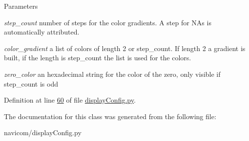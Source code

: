 \begin{DoxyParams}{Parameters}
\item[{\em step\_\-count}]number of steps for the color gradients. A step for NAs is automatically attributed. \item[{\em color\_\-gradient}]a list of colors of length 2 or step\_\-count. If length 2 a gradient is built, if the length is step\_\-count the list is used for the colors. \item[{\em zero\_\-color}]an hexadecimal string for the color of the zero, only visible if step\_\-count is odd \end{DoxyParams}


Definition at line \hyperlink{displayConfig_8py_source_l00060}{60} of file \hyperlink{displayConfig_8py_source}{displayConfig.py}.



The documentation for this class was generated from the following file:\begin{DoxyCompactItemize}
\item 
navicom/displayConfig.py\end{DoxyCompactItemize}
